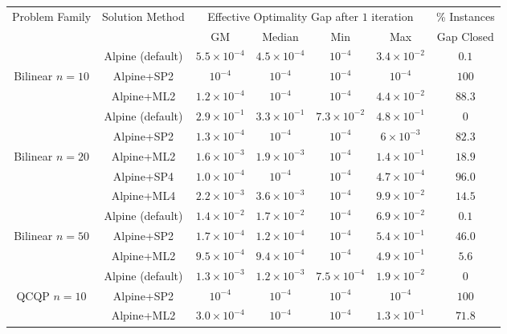 \documentclass{article}
\begin{document}
\begin{table}[t]
\centering
\begin{tabular}{ c | c | c c c c | c }
\hline
Problem Family & Solution Method & \multicolumn{4}{c|}{Effective Optimality Gap after $1$ iteration} & \% Instances \\
& & GM & Median & Min & Max & Gap Closed \\ \hline
&  Alpine (default)  &  $5.5 \times 10^{-4}$  &  $4.5 \times 10^{-4}$  &  $10^{-4}$  &  $3.4 \times 10^{-2}$  &  $0.1$ \\
Bilinear $n = 10$  &  Alpine+SP2  &  $10^{-4}$  &  $10^{-4}$  &  $10^{-4}$  &  $10^{-4}$  &  $100$ \\
&  Alpine+ML2  &  $1.2 \times 10^{-4}$  &  $10^{-4}$  &  $10^{-4}$  &  $4.4 \times 10^{-2}$  &  $88.3$ \\[0.1in]
&  Alpine (default)  &  $2.9 \times 10^{-1}$  &  $3.3 \times 10^{-1}$  &  $7.3 \times 10^{-2}$  &  $4.8 \times 10^{-1}$  &  $0$ \\
&  Alpine+SP2  &  $1.3 \times 10^{-4}$  &  $10^{-4}$  &  $10^{-4}$  &  $6 \times 10^{-3}$  &  $82.3$ \\
Bilinear $n = 20$  &  Alpine+ML2  &  $1.6 \times 10^{-3}$  &  $1.9 \times 10^{-3}$  &  $10^{-4}$  &  $1.4 \times 10^{-1}$  &  $18.9$ \\
&  Alpine+SP4  &  $1.0 \times 10^{-4}$  &  $10^{-4}$  &  $10^{-4}$  &  $4.7 \times 10^{-4}$  &  $96.0$ \\
&  Alpine+ML4  &  $2.2 \times 10^{-3}$  &  $3.6 \times 10^{-3}$  &  $10^{-4}$  &  $9.9 \times 10^{-2}$  &  $14.5$ \\[0.1in]
&  Alpine (default)  &  $1.4 \times 10^{-2}$  &  $1.7 \times 10^{-2}$  &  $10^{-4}$  &  $6.9 \times 10^{-2}$ & $0.1$  \\
Bilinear $n = 50$ &  Alpine+SP2  &  $1.7 \times 10^{-4}$  &  $1.2 \times 10^{-4}$  &  $10^{-4}$  &  $5.4 \times 10^{-1}$ & $46.0$ \\
&  Alpine+ML2  &  $9.5 \times 10^{-4}$  &  $9.4 \times 10^{-4}$  &  $10^{-4}$  &  $4.9 \times 10^{-1}$ & $5.6$ \\[0.1in]
&  Alpine (default)  &  $1.3 \times 10^{-3}$  &  $1.2 \times 10^{-3}$  &  $7.5 \times 10^{-4}$  &  $1.9 \times 10^{-2}$  &  $0$ \\
QCQP $n = 10$  &  Alpine+SP2  &  $10^{-4}$  &  $10^{-4}$  &  $10^{-4}$  &  $10^{-4}$  &  $100$ \\
&  Alpine+ML2  &  $3.0 \times 10^{-4}$  &  $10^{-4}$  &  $10^{-4}$  &  $1.3 \times 10^{-1}$  &  $71.8$ \\[0.1in]

\end{tabular}
\end{table}
\end{document}
